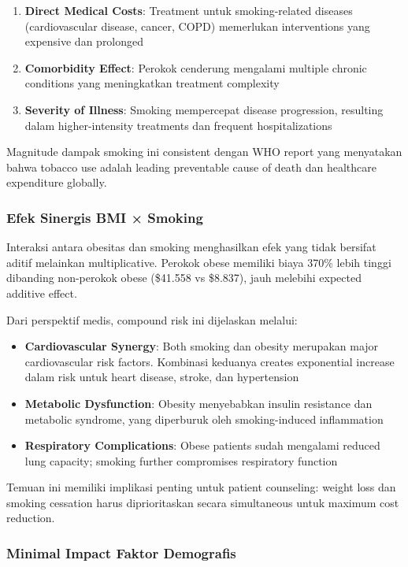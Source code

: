 \begin{enumerate}
    \item \textbf{Direct Medical Costs}: Treatment untuk smoking-related diseases (cardiovascular disease, cancer, COPD) memerlukan interventions yang expensive dan prolonged
    \item \textbf{Comorbidity Effect}: Perokok cenderung mengalami multiple chronic conditions yang meningkatkan treatment complexity
    \item \textbf{Severity of Illness}: Smoking mempercepat disease progression, resulting dalam higher-intensity treatments dan frequent hospitalizations
\end{enumerate}

Magnitude dampak smoking ini consistent dengan WHO report yang menyatakan bahwa tobacco use adalah leading preventable cause of death dan healthcare expenditure globally.

\subsubsection{Efek Sinergis BMI × Smoking}

Interaksi antara obesitas dan smoking menghasilkan efek yang tidak bersifat aditif melainkan multiplicative. Perokok obese memiliki biaya 370\% lebih tinggi dibanding non-perokok obese (\$41.558 vs \$8.837), jauh melebihi expected additive effect.

Dari perspektif medis, compound risk ini dijelaskan melalui:

\begin{itemize}
    \item \textbf{Cardiovascular Synergy}: Both smoking dan obesity merupakan major cardiovascular risk factors. Kombinasi keduanya creates exponential increase dalam risk untuk heart disease, stroke, dan hypertension
    \item \textbf{Metabolic Dysfunction}: Obesity menyebabkan insulin resistance dan metabolic syndrome, yang diperburuk oleh smoking-induced inflammation
    \item \textbf{Respiratory Complications}: Obese patients sudah mengalami reduced lung capacity; smoking further compromises respiratory function
\end{itemize}

Temuan ini memiliki implikasi penting untuk patient counseling: weight loss dan smoking cessation harus diprioritaskan secara simultaneous untuk maximum cost reduction.

\subsubsection{Minimal Impact Faktor Demografis}


